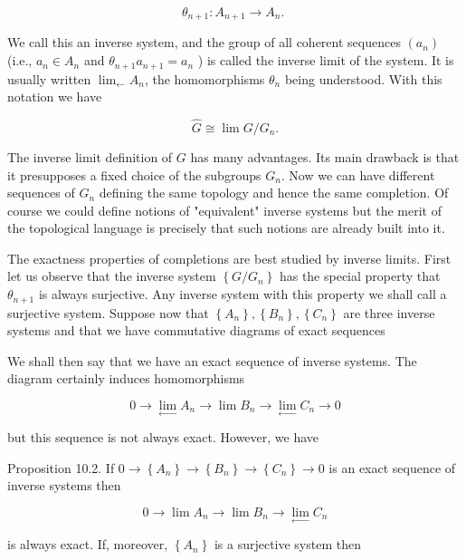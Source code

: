 \documentclass{standalone}
\theoremstyle{definition}
\theoremstyle{remark}
\begin{document}
\[
\theta_{n+1}: A_{n+1} \rightarrow A_{n} \text {. }
\]

We call this an inverse system, and the group of all coherent sequences $\left(a_{n}\right)$ (i.e., $a_{n} \in A_{n}$ and $\theta_{n+1} a_{n+1}=a_{n}$ ) is called the inverse limit of the system. It is usually written $\lim _{\leftarrow} A_{n}$, the homomorphisms $\theta_{n}$ being understood. With this notation we have

\[
\hat{G} \cong \lim G / G_{n} .
\]

The inverse limit definition of $G$ has many advantages. Its main drawback is that it presupposes a fixed choice of the subgroups $G_{n}$. Now we can have different sequences of $G_{n}$ defining the same topology and hence the same completion. Of course we could define notions of "equivalent" inverse systems but the merit of the topological language is precisely that such notions are already built into it.

The exactness properties of completions are best studied by inverse limits. First let us observe that the inverse system $\left\{G / G_{n}\right\}$ has the special property that $\theta_{n+1}$ is always surjective. Any inverse system with this property we shall call a surjective system. Suppose now that $\left\{A_{n}\right\},\left\{B_{n}\right\},\left\{C_{n}\right\}$ are three inverse systems and that we have commutative diagrams of exact sequences

\begin{center}
\end{center}

We shall then say that we have an exact sequence of inverse systems. The diagram certainly induces homomorphisms

\[
0 \rightarrow \lim _{\longleftarrow} A_{n} \rightarrow \lim B_{n} \rightarrow \lim _{\longleftarrow} C_{n} \rightarrow 0
\]

but this sequence is not always exact. However, we have

Proposition 10.2. If $0 \rightarrow\left\{A_{n}\right\} \rightarrow\left\{B_{n}\right\} \rightarrow\left\{C_{n}\right\} \rightarrow 0$ is an exact sequence of inverse systems then

\[
0 \rightarrow \lim A_{n} \rightarrow \lim B_{n} \rightarrow \lim _{\longleftarrow} C_{n}
\]

is always exact. If, moreover, $\left\{A_{n}\right\}$ is a surjective system then
\end{document}
